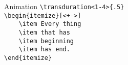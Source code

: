 \begin{frame}[fragile]{Animation}
    \lstinline[basicstyle=\tt]|\transduration<1-4>{.5}| \\
    \lstinline[basicstyle=\tt]|\begin{itemize}[<+->]| \\
    \lstinline[basicstyle=\tt]|    \item Every thing|   \\
    \lstinline[basicstyle=\tt]|    \item that has|   \\
    \lstinline[basicstyle=\tt]|    \item beginning| \\
    \lstinline[basicstyle=\tt]|    \item has end.|   \\
    \lstinline[basicstyle=\tt]|\end{itemize}|
\end{frame}